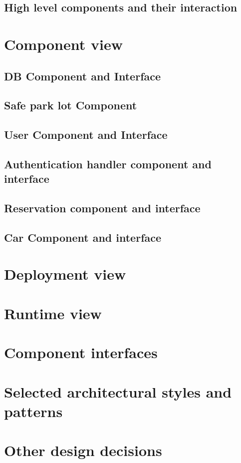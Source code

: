 \documentclass[a4paper,12pt,oneside]{report}
\begin{document}
\subsection{High level components and their interaction}
\newpage
\section{Component view}
\subsection{DB Component and Interface}
\subsection{Safe park lot Component}
\subsection{User Component and Interface}
\subsection{Authentication handler component and interface}
\subsection{Reservation component and interface}
\subsection{Car Component and interface}
\newpage
\section{Deployment view}
\newpage
\section{Runtime view}
\newpage
\section{Component interfaces}
\newpage
\section{Selected architectural styles and patterns}
\newpage
\section{Other design decisions}
\end{document}
